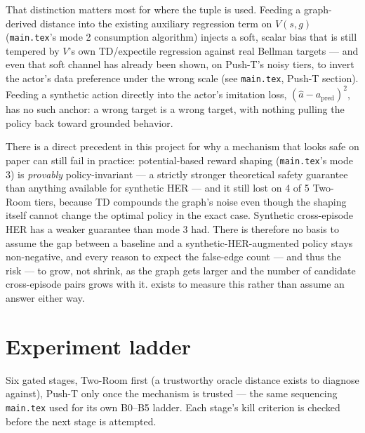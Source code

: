 \documentclass[11pt]{article}
\begin{document}
That distinction matters most for where the tuple is used. Feeding a graph-derived distance into
the existing auxiliary regression term on $V(s,g)$ (\texttt{main.tex}'s mode 2 consumption
algorithm) injects a soft, scalar bias that is still tempered by $V$'s own TD/expectile regression
against real Bellman targets --- and even that soft channel has already been shown, on Push-T's
noisy tiers, to invert the actor's data preference under the wrong scale (see
\texttt{main.tex}, Push-T section). Feeding a synthetic action directly into the actor's
imitation loss, $(\hat a - a_{\mathrm{pred}})^2$, has no such anchor: a wrong target is a wrong
target, with nothing pulling the policy back toward grounded behavior.

There is a direct precedent in this project for why a mechanism that looks safe on paper can
still fail in practice: potential-based reward shaping (\texttt{main.tex}'s mode 3) is
\emph{provably} policy-invariant --- a strictly stronger theoretical safety guarantee than
anything available for synthetic HER --- and it still lost on 4 of 5 Two-Room tiers, because TD
compounds the graph's noise even though the shaping itself cannot change the optimal policy in
the exact case. Synthetic cross-episode HER has a weaker guarantee than mode 3 had. There is
therefore no basis to assume the gap between a baseline and a synthetic-HER-augmented policy stays
non-negative, and every reason to expect the false-edge count --- and thus the risk --- to grow,
not shrink, as the graph gets larger and the number of candidate cross-episode pairs grows with
it.  exists to measure this rather than assume an answer either way.

\section{Experiment ladder}
\label{sec:ladder}

Six gated stages, Two-Room first (a trustworthy oracle distance exists to diagnose against),
Push-T only once the mechanism is trusted --- the same sequencing \texttt{main.tex} used for its
own B0--B5 ladder. Each stage's kill criterion is checked before the next stage is attempted.
\end{document}
